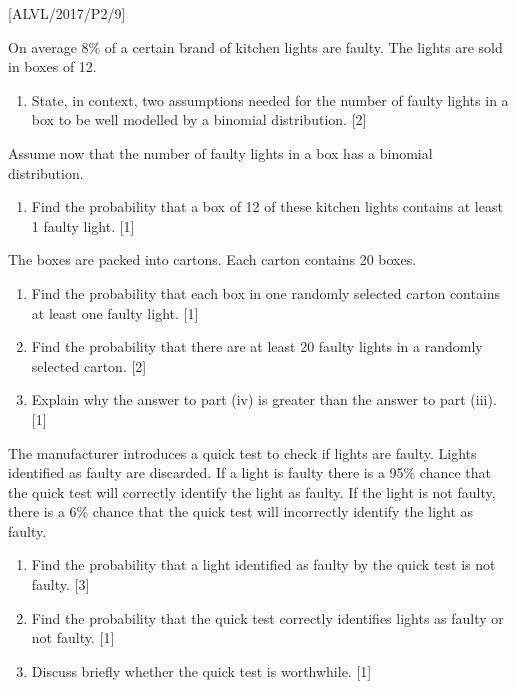 \item {[}ALVL/2017/P2/9{]}

On average 8\% of a certain brand of kitchen lights are faulty. The
lights are sold in boxes of 12. 
\begin{enumerate}
\item State, in context, two assumptions needed for the number of faulty
lights in a box to be well modelled by a binomial distribution. \hfill{}{[}2{]}
\end{enumerate}
Assume now that the number of faulty lights in a box has a binomial
distribution.
\begin{enumerate}
\item Find the probability that a box of 12 of these kitchen lights contains
at least 1 faulty light. \hfill{}{[}1{]}
\end{enumerate}
The boxes are packed into cartons. Each carton contains 20 boxes.
\begin{enumerate}
\item Find the probability that each box in one randomly selected carton
contains at least one faulty light.\hfill{} {[}1{]}
\item Find the probability that there are at least 20 faulty lights in a
randomly selected carton. \hfill{}{[}2{]}
\item Explain why the answer to part (iv) is greater than the answer to
part (iii). \hfill{}{[}1{]}
\end{enumerate}
The manufacturer introduces a quick test to check if lights are faulty.
Lights identified as faulty are discarded. If a light is faulty there
is a 95\% chance that the quick test will correctly identify the light
as faulty. If the light is not faulty, there is a 6\% chance that
the quick test will incorrectly identify the light as faulty. 
\begin{enumerate}
\item Find the probability that a light identified as faulty by the quick
test is not faulty.\hfill{} {[}3{]}
\item Find the probability that the quick test correctly identifies lights
as faulty or not faulty. \hfill{}{[}1{]}
\item Discuss briefly whether the quick test is worthwhile.\hfill{} {[}1{]}
\end{enumerate}
